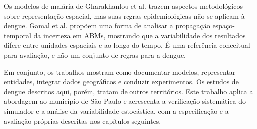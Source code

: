 Os modelos de malária de Gharakhanlou et al. \cite{gharakhanlou_2019, gharakhanlou_2020} trazem aspectos metodológicos sobre representação espacial, mas suas regras epidemiológicas não se aplicam à dengue. Gamal et al. \cite{gamal_etal_2025} propõem uma forma de analisar a propagação espaço-temporal da incerteza em ABMs, mostrando que a variabilidade dos resultados difere entre unidades espaciais e ao longo do tempo. É uma referência conceitual para avaliação, e não um conjunto de regras para a dengue.

Em conjunto, os trabalhos mostram como documentar modelos, representar entidades, integrar dados geográficos e conduzir experimentos. Os estudos de dengue descritos aqui, porém, tratam de outros territórios. Este trabalho aplica a abordagem ao município de São Paulo e acrescenta a verificação sistemática do simulador e a análise da variabilidade estocástica, com a especificação e a avaliação próprias descritas nos capítulos seguintes.